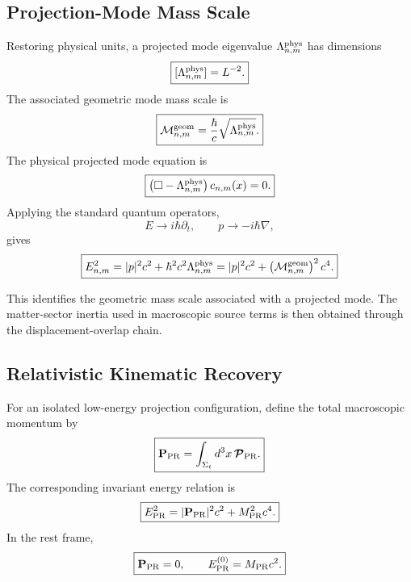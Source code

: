 \documentclass[11pt]{article}
\begin{document}
\subsection{Projection-Mode Mass Scale}

Restoring physical units, a projected mode eigenvalue
\(\Lambda_{n,m}^{\rm phys}\) has dimensions
\begin{equation}
\boxed{
[\Lambda_{n,m}^{\rm phys}]
=
L^{-2}.
}
\end{equation}
The associated geometric mode mass scale is
\begin{equation}
\boxed{
\mathcal M_{n,m}^{\rm geom}
=
\frac{\hbar}{c}
\sqrt{\Lambda_{n,m}^{\rm phys}}.
}
\end{equation}
The physical projected mode equation is
\begin{equation}
\boxed{
\left(
\Box-\Lambda_{n,m}^{\rm phys}
\right)c_{n,m}(x)
=
0.
}
\end{equation}
Applying the standard quantum operators,
\begin{equation}
\boxed{
E\rightarrow i\hbar\partial_t,
\qquad
p\rightarrow -i\hbar\nabla,
}
\end{equation}
gives
\begin{equation}
\boxed{
E_{n,m}^2
=
|p|^2c^2
+
\hbar^2c^2\Lambda_{n,m}^{\rm phys}
=
|p|^2c^2
+
\left(
\mathcal M_{n,m}^{\rm geom}
\right)^2c^4.
}
\end{equation}

This identifies the geometric mass scale associated with a projected mode. The
matter-sector inertia used in macroscopic source terms is then obtained through
the displacement-overlap chain.

\subsection{Relativistic Kinematic Recovery}

For an isolated low-energy projection configuration, define the total
macroscopic momentum by
\begin{equation}
\boxed{
\mathbf P_{\rm PR}
=
\int_{\Sigma_t}
d^3x\,\boldsymbol{\mathcal P}_{\rm PR}.
}
\end{equation}
The corresponding invariant energy relation is
\begin{equation}
\boxed{
E_{\rm PR}^2
=
|\mathbf P_{\rm PR}|^2c^2
+
M_{\rm PR}^2c^4.
}
\end{equation}
In the rest frame,
\begin{equation}
\boxed{
\mathbf P_{\rm PR}=0,
\qquad
E_{\rm PR}^{(0)}
=
M_{\rm PR}c^2.
}
\end{equation}
\end{document}

